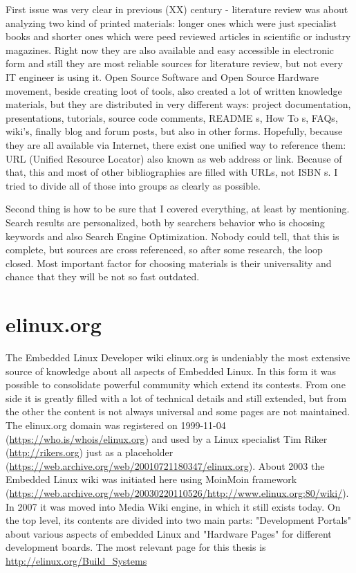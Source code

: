 \documentclass[printmode]{mgr}
\begin{document}
First issue was very clear in previous (XX) century - literature review was about analyzing two kind of printed materials: longer ones which were just specialist books and shorter ones which were peed reviewed articles in scientific or industry magazines.
Right now they are also available and easy accessible in electronic form and still they are most reliable sources for literature review, but not every IT engineer is using it.
Open Source Software and Open Source Hardware movement, beside creating loot of tools, also created a lot of written knowledge materials, but they are distributed in very different ways: project documentation, presentations, tutorials, source code comments, README s, How To s, FAQs, wiki's, finally blog and forum posts, but also in other forms.
Hopefully, because they are all available via Internet, there exist one unified way to reference them: URL (Unified Resource Locator) also known as web address or link. Because of that, this and most of other bibliographies are filled with URLs, not ISBN s. I tried to divide all of those into groups as clearly as possible.

Second thing is how to be sure that I covered everything, at least by mentioning. Search results are personalized, both by searchers behavior who is choosing keywords and also Search Engine Optimization. Nobody could tell, that this is complete, but sources are cross referenced, so after some research, the loop closed. Most important factor for choosing materials is their universality and chance that they will be not so fast outdated.

\section{elinux.org}

The Embedded Linux Developer wiki elinux.org is undeniably the most extensive source of knowledge about all aspects of Embedded Linux.
In this form it was possible to consolidate powerful community which extend its contests.
From one side it is greatly filled with a lot of technical details and still extended, but from the other the content is not always universal and some pages are not maintained.\\

The elinux.org domain was registered on 1999-11-04 (\url{https://who.is/whois/elinux.org}) and used by a Linux specialist Tim Riker (\url{http://rikers.org}) just as a placeholder (\url{https://web.archive.org/web/20010721180347/elinux.org}).
About 2003 the Embedded Linux wiki was initiated here using MoinMoin framework (\url{https://web.archive.org/web/20030220110526/http://www.elinux.org:80/wiki/}).
In 2007 it was moved into Media Wiki engine, in which it still exists today.
On the top level, its contents are divided into two main parts: "Development Portals" about various aspects of embedded Linux and "Hardware Pages" for different development boards.
The most relevant page for this thesis is \url{http://elinux.org/Build_Systems}\\
\end{document}
